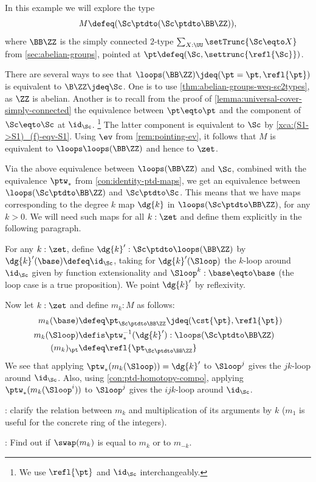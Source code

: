 \begin{example}\label{exa:allS1*-swap}
In this example we will explore the type $$M\defeq(\Sc\ptdto(\Sc\ptdto\BB\ZZ)),$$
where $\BB\ZZ$ is the simply connected $2$-type $\sum_{X:\UU}\setTrunc{\Sc\eqto X}$
from \cref{sec:abelian-groups}, pointed at 
$\pt\defeq(\Sc,\settrunc{\refl{\Sc}})$. 

There are several ways to see that $\loops(\BB\ZZ) \jdeq (\pt=\pt,\refl{\pt})$
is equivalent to $\B\ZZ \jdeq \Sc$. One is to use
\cref{thm:abelian-groups-weq-sc2types}, as $\ZZ$ is abelian.
Another is to
recall from the proof of
\cref{lemma:universal-cover-simply-connected} the equivalence
between $\pt\eqto\pt$ and the component of $\Sc\eqto\Sc$ at $\id_\Sc$.%
\footnote{We use $\refl{\pt}$ and $\id_\Sc$ interchangeably.}
The latter component is equivalent to $\Sc$ by 
\cref{xca:(S1->S1)_(f)-eqv-S1}. Using $\ev$ from \cref{rem:pointing-ev},
it follows that $M$ is equivalent to $\loops\loops(\BB\ZZ)$ 
and hence to $\zet$.

Via the above equivalence between $\loops(\BB\ZZ)$ and $\Sc$, 
combined with the equivalence $\ptw_*$ from \cref{con:identity-ptd-maps},
we get an equivalence between $\loops(\Sc\ptdto\BB\ZZ)$ and $\Sc\ptdto\Sc$.
This means that we have maps corresponding to the degree $k$ map $\dg{k}$
in $\loops(\Sc\ptdto\BB\ZZ)$, for any $k>0$. We will need such maps for
all $k:\zet$ and define them explicitly in the following paragraph.


For any $k:\zet$, define $\dg{k}': \Sc\ptdto\loops(\BB\ZZ)$ by 
$\dg{k}'(\base)\defeq\id_\Sc$, taking for $\dg{k}'(\Sloop)$
the $k$-loop around $\id_\Sc$ given by function extensionality and
$\Sloop^k:\base\eqto\base$ (the loop case is a true proposition).
We point $\dg{k}'$ by reflexivity.

Now let $k:\zet$ and define $m_k:M$ as follows:
\begin{align*}
m_k(\base) &\defeq\pt_{\Sc\ptdto\BB\ZZ}\jdeq(\cst{\pt},\refl{\pt}) \\
m_k(\Sloop) &\defis\ptw_*^{-1} (\dg{k}') :\loops(\Sc\ptdto\BB\ZZ)\\
(m_k)_\pt &\defeq\refl{\pt_{\Sc\ptdto\BB\ZZ}}
\end{align*}
We see that applying $\ptw_*(m_k(\Sloop))=\dg{k}'$ to $\Sloop^j$ 
gives the $jk$-loop around $\id_\Sc$.
Also, using \cref{con:ptd-homotopy-compo}, 
applying $\ptw_*(m_k(\Sloop^i))$ to $\Sloop^j$ 
gives the $ijk$-loop around $\id_\Sc$.

: clarify the relation between $m_k$ and multiplication of
its arguments by $k$ ($m_1$ is useful for the concrete ring of the integers).

: Find out if $\swap(m_k)$ is equal to $m_k$ or to $m_{-k}$.
\end{example}

